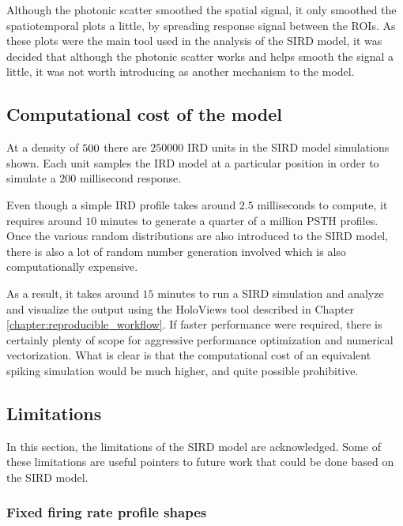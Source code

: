 \documentclass[phd,ianc,twoside]{infthesis}
\begin{document}
Although the photonic scatter smoothed the spatial signal, it only
smoothed the spatiotemporal plots a little, by spreading response signal
between the ROIs. As these plots were the main tool used in the analysis
of the SIRD model, it was decided that although the photonic scatter
works and helps smooth the signal a little, it was not worth introducing
as another mechanism to the model.

\subsection{Computational cost of the model}
\label{section:SIRD_computational cost}

At a density of $500\time500$ there are $250000$ IRD units in the SIRD
model simulations shown. Each unit samples the IRD model at a particular
position in order to simulate a $200$ millisecond response.

Even though a simple IRD profile takes around $2.5$ milliseconds to
compute, it requires around $10$ minutes to generate a quarter of a
million PSTH profiles. Once the various random distributions are also
introduced to the SIRD model, there is also a lot of random number
generation involved which is also computationally expensive.

As a result, it takes around $15$ minutes to run a SIRD simulation and
analyze and visualize the output using the HoloViews tool described in
Chapter \ref{chapter:reproducible_workflow}. If faster performance were
required, there is certainly plenty of scope for aggressive performance
optimization and numerical vectorization. What is clear is that the
computational cost of an equivalent spiking simulation would be much
higher, and quite possible prohibitive.

\subsection{Limitations}
\label{section:limitations}

In this section, the limitations of the SIRD model are
acknowledged. Some of these limitations are useful pointers to future
work that could be done based on the SIRD model.

\subsubsection*{Fixed firing rate profile shapes}
\label{section:firing_rate_limitations}
\end{document}
